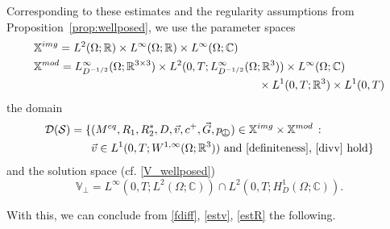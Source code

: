 \documentclass{ws-m3as}
\def\pp{p_{\perp\!\!\!\!\!\bigcirc}}
\newcommand{\revision}[1]{{ #1}}
\newcommand{\Margin}[1]{}
\begin{document}
Corresponding to these estimates and the regularity assumptions from Proposition~\ref{prop:wellposed}, we use the parameter spaces 
\begin{equation}\label{X}
\begin{aligned}
&\mathbb{X}^{img}=L^2(\Omega;\mathbb{R})\times L^\infty(\Omega;\mathbb{R})\times L^\infty(\Omega;\mathbb{C})\\
&\mathbb{X}^{mod}=L^\infty_{D^{-1/2}}(\Omega;\mathbb{R}^{3\times 3})\times L^2(0,T;L^\infty_{D^{-1/2}}(\Omega;\mathbb{R}^3))\times L^\infty(\Omega;\mathbb{C})\\
&\hspace*{7cm}\times L^1(0,T;\mathbb{R}^3)\times L^1(0,T)
\end{aligned}
\end{equation}
the domain
\begin{equation}\label{DS}
\begin{aligned}
\mathcal{D}(\mathcal{S})=\{&(M^{eq},R_1,R_2^*,D,\vec v,c^+,\vec G,\pp)\in \mathbb{X}^{img}\times \mathbb{X}^{mod}\, : \,\\ 
&\vec v\in L^1(0,T;W^{1,\infty}(\Omega;\mathbb{R}^3)) \text{ and \eqref{definiteness}, \eqref{divv}  hold}\}
\end{aligned}
\end{equation}
and the solution space (cf. \eqref{V_wellposed})
\begin{equation}\label{V}
\mathbb{V}_\perp=L^\infty(0,T;L^2(\Omega;\mathbb{C}))\cap L^2(0,T;H_D^1(\Omega;\mathbb{C})).
\end{equation}

\revision{With this, we can conclude from \eqref{fdiff}, \eqref{estv}, \eqref{estR} the following.}
\Margin{R1 E.}
\end{document}
